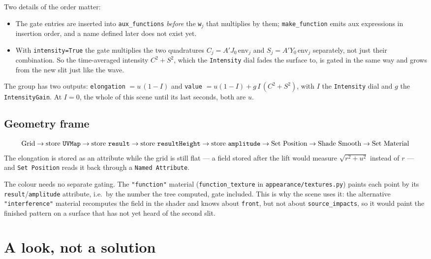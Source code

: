 \documentclass[11pt,a4paper]{article}
\newcommand{\node}[1]{\texttt{#1}}
\begin{document}
Two details of the order matter:
\begin{itemize}[leftmargin=*]
  \item The gate entries are inserted into \node{aux\_functions}
        \emph{before} the \node{w$_j$} that multiplies by them;
        \node{make\_function} emits aux expressions in insertion order, and a
        name defined later does not exist yet.
  \item With \node{intensity=True} the gate multiplies the two quadratures
        $C_j=A'J_0\,\mathrm{env}_j$ and $S_j=A'Y_0\,\mathrm{env}_j$ separately,
        not just their combination. So the time-averaged intensity
        $C^2+S^2$, which the \node{Intensity} dial fades the surface to, is
        gated in the same way and grows from the new slit just like the wave.
\end{itemize}

The group has two outputs: \node{elongation} $=u\,(1-I)$ and \node{value}
$=u(1-I)+g\,I\,(C^2+S^2)$, with $I$ the \node{Intensity} dial and $g$ the
\node{IntensityGain}. At $I=0$, the whole of this scene until its last
seconds, both are $u$.

\subsection{Geometry frame}

\[
  \text{Grid}\to\text{store \node{UVMap}}\to\text{store \node{result}}
  \to\text{store \node{resultHeight}}\to\text{store \node{amplitude}}
  \to\text{Set Position}\to\text{Shade Smooth}\to\text{Set Material}
\]
The elongation is stored as an attribute while the grid is still flat --- a
field stored after the lift would measure $\sqrt{r^2+u^2}$ instead of $r$ ---
and \node{Set Position} reads it back through a \node{Named Attribute}.

The colour needs no separate gating. The \node{"function"} material
(\node{function\_texture} in \node{appearance/textures.py}) paints each point
by its \node{result}/\node{amplitude} attribute, i.e.\ by the number the tree
computed, gate included. This is why the scene uses it: the alternative
\node{"interference"} material recomputes the field in the shader and knows
about \node{front}, but not about \node{source\_impacts}, so it would paint the
finished pattern on a surface that has not yet heard of the second slit.

\section{A look, not a solution}
\end{document}
